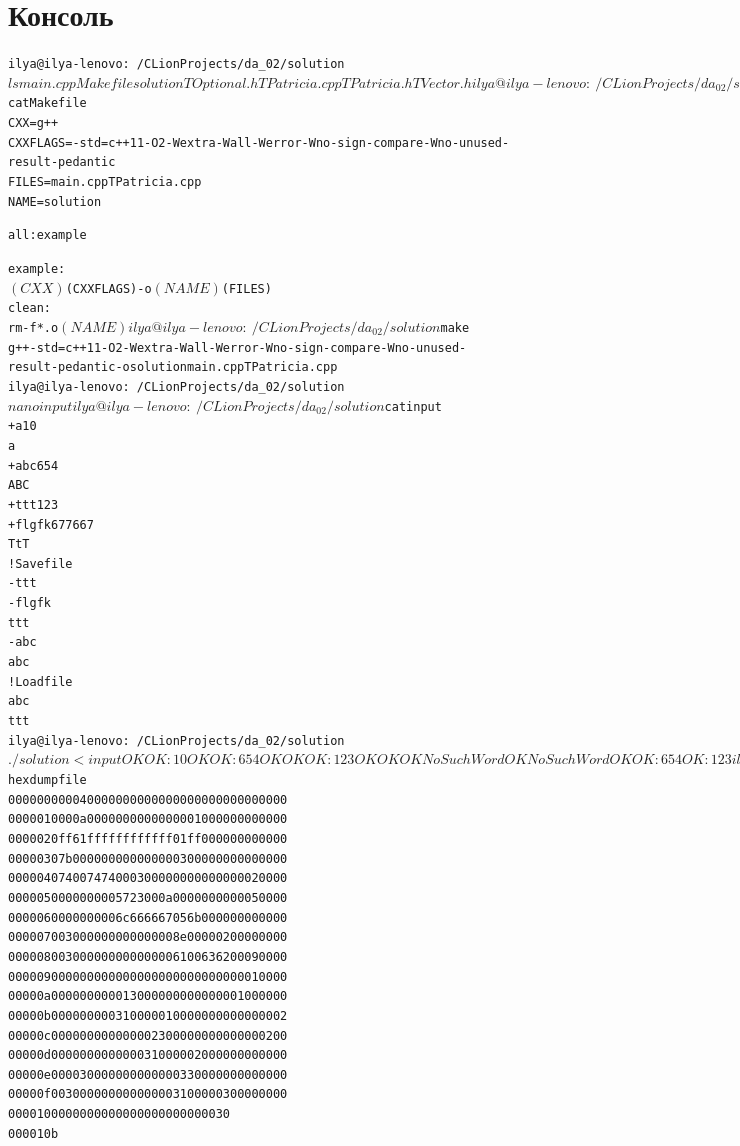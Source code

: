 \section{Консоль}
\begin{alltt}
ilya@ilya-lenovo:~/CLionProjects/da_02/solution$ ls
main.cpp  Makefile  solution  TOptional.h  TPatricia.cpp  TPatricia.h  TVector.h
ilya@ilya-lenovo:~/CLionProjects/da_02/solution$ cat Makefile 
CXX = g++
CXXFLAGS = -std=c++11 -O2 -Wextra -Wall -Werror -Wno-sign-compare -Wno-unused-result -pedantic
FILES = main.cpp TPatricia.cpp
NAME = solution

all: example

example:
	$(CXX) $(CXXFLAGS) -o $(NAME) $(FILES)
clean:
	rm -f *.o $(NAME)
ilya@ilya-lenovo:~/CLionProjects/da_02/solution$ make
g++ -std=c++11 -O2 -Wextra -Wall -Werror -Wno-sign-compare -Wno-unused-result -pedantic -o solution main.cpp TPatricia.cpp
ilya@ilya-lenovo:~/CLionProjects/da_02/solution$ nano input 
ilya@ilya-lenovo:~/CLionProjects/da_02/solution$ cat input
+ a 10
a
+ abc 654
ABC
+ ttt 123
+ flgfk 677667
TtT
! Save file
- ttt
- flgfk
ttt
- abc
abc 
! Load file
abc
ttt
ilya@ilya-lenovo:~/CLionProjects/da_02/solution$ ./solution < input 
OK
OK: 10
OK
OK: 654
OK
OK
OK: 123
OK
OK
OK
NoSuchWord
OK
NoSuchWord
OK
OK: 654
OK: 123
ilya@ilya-lenovo:~/CLionProjects/da_02/solution$ hexdump file
0000000 0004 0000 0000 0000 0000 0000 0000 0000
0000010 000a 0000 0000 0000 0001 0000 0000 0000
0000020 ff61 ffff ffff ffff 01ff 0000 0000 0000
0000030 7b00 0000 0000 0000 0300 0000 0000 0000
0000040 7400 7474 0003 0000 0000 0000 0002 0000
0000050 0000 0000 5723 000a 0000 0000 0005 0000
0000060 0000 0000 6c66 6667 056b 0000 0000 0000
0000070 0300 0000 0000 0000 8e00 0002 0000 0000
0000080 0300 0000 0000 0000 6100 6362 0009 0000
0000090 0000 0000 0000 0000 0000 0000 0001 0000
00000a0 0000 0000 0130 0000 0000 0000 0100 0000
00000b0 0000 0000 3100 0001 0000 0000 0000 0002
00000c0 0000 0000 0000 0230 0000 0000 0000 0200
00000d0 0000 0000 0000 3100 0002 0000 0000 0000
00000e0 0003 0000 0000 0000 0330 0000 0000 0000
00000f0 0300 0000 0000 0000 3100 0003 0000 0000
0000100 0000 0000 0000 0000 0000 0030          
000010b

\end{alltt}
\pagebreak


